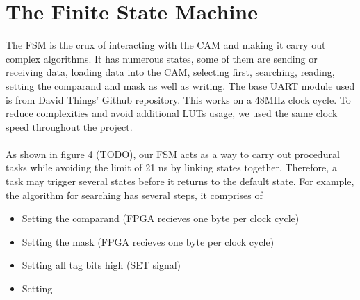 \section{The Finite State Machine}
The FSM is the crux of interacting with the CAM and making it carry out complex algorithms. 
It has numerous states, some of them are sending or receiving data, loading data into the CAM, selecting first, searching, reading, setting the comparand and mask as well as writing. 
The base UART module used is from David Things' Github repository. \cite{uart} This works on a 48MHz clock cycle.
To reduce complexities and avoid additional LUTs usage, we used the same clock speed throughout the project. 
\\\\
As shown in figure 4 (TODO), our FSM acts as a way to carry out procedural tasks while avoiding the limit of 21 ns by linking states together. 
Therefore, a task may trigger several states before it returns to the default state. 
For example, the algorithm for searching has several steps, it comprises of
\begin{itemize}
    \item Setting the comparand (FPGA recieves one byte per clock cycle)
    \item Setting the mask (FPGA recieves one byte per clock cycle)
    \item Setting all tag bits high (SET signal)
    \item Setting 
\end{itemize}